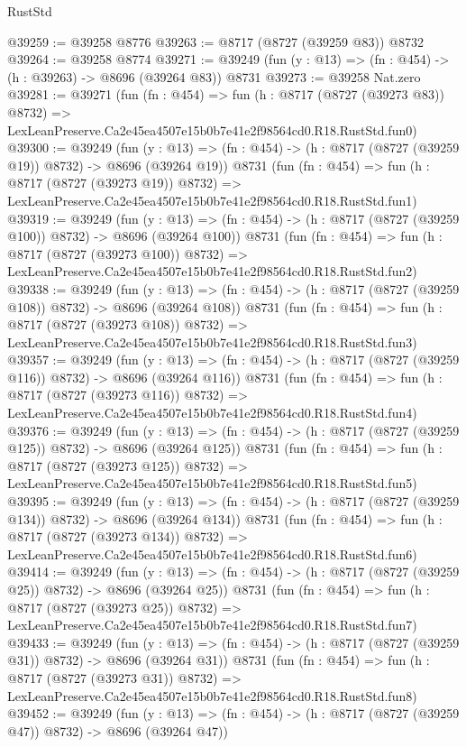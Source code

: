 \begin{lexlean}{RustStd}
\begin{coremodule}
@39259 := @39258 @8776
@39263 := @8717 (@8727 (@39259 @83)) @8732
@39264 := @39258 @8774
@39271 := @39249 (fun (y : @13) => (fn : @454) -> (h : @39263) -> @8696 (@39264 @83)) @8731
@39273 := @39258 Nat.zero
@39281 := @39271
    (fun (fn : @454) =>
    fun (h : @8717 (@8727 (@39273 @83)) @8732) =>
    LexLeanPreserve.Ca2e45ea4507e15b0b7e41e2f98564cd0.R18.RustStd.fun0)
@39300 := @39249
    (fun (y : @13) => (fn : @454) -> (h : @8717 (@8727 (@39259 @19)) @8732) -> @8696 (@39264 @19))
    @8731
    (fun (fn : @454) =>
    fun (h : @8717 (@8727 (@39273 @19)) @8732) =>
    LexLeanPreserve.Ca2e45ea4507e15b0b7e41e2f98564cd0.R18.RustStd.fun1)
@39319 := @39249
    (fun (y : @13) => (fn : @454) -> (h : @8717 (@8727 (@39259 @100)) @8732) -> @8696 (@39264 @100))
    @8731
    (fun (fn : @454) =>
    fun (h : @8717 (@8727 (@39273 @100)) @8732) =>
    LexLeanPreserve.Ca2e45ea4507e15b0b7e41e2f98564cd0.R18.RustStd.fun2)
@39338 := @39249
    (fun (y : @13) => (fn : @454) -> (h : @8717 (@8727 (@39259 @108)) @8732) -> @8696 (@39264 @108))
    @8731
    (fun (fn : @454) =>
    fun (h : @8717 (@8727 (@39273 @108)) @8732) =>
    LexLeanPreserve.Ca2e45ea4507e15b0b7e41e2f98564cd0.R18.RustStd.fun3)
@39357 := @39249
    (fun (y : @13) => (fn : @454) -> (h : @8717 (@8727 (@39259 @116)) @8732) -> @8696 (@39264 @116))
    @8731
    (fun (fn : @454) =>
    fun (h : @8717 (@8727 (@39273 @116)) @8732) =>
    LexLeanPreserve.Ca2e45ea4507e15b0b7e41e2f98564cd0.R18.RustStd.fun4)
@39376 := @39249
    (fun (y : @13) => (fn : @454) -> (h : @8717 (@8727 (@39259 @125)) @8732) -> @8696 (@39264 @125))
    @8731
    (fun (fn : @454) =>
    fun (h : @8717 (@8727 (@39273 @125)) @8732) =>
    LexLeanPreserve.Ca2e45ea4507e15b0b7e41e2f98564cd0.R18.RustStd.fun5)
@39395 := @39249
    (fun (y : @13) => (fn : @454) -> (h : @8717 (@8727 (@39259 @134)) @8732) -> @8696 (@39264 @134))
    @8731
    (fun (fn : @454) =>
    fun (h : @8717 (@8727 (@39273 @134)) @8732) =>
    LexLeanPreserve.Ca2e45ea4507e15b0b7e41e2f98564cd0.R18.RustStd.fun6)
@39414 := @39249
    (fun (y : @13) => (fn : @454) -> (h : @8717 (@8727 (@39259 @25)) @8732) -> @8696 (@39264 @25))
    @8731
    (fun (fn : @454) =>
    fun (h : @8717 (@8727 (@39273 @25)) @8732) =>
    LexLeanPreserve.Ca2e45ea4507e15b0b7e41e2f98564cd0.R18.RustStd.fun7)
@39433 := @39249
    (fun (y : @13) => (fn : @454) -> (h : @8717 (@8727 (@39259 @31)) @8732) -> @8696 (@39264 @31))
    @8731
    (fun (fn : @454) =>
    fun (h : @8717 (@8727 (@39273 @31)) @8732) =>
    LexLeanPreserve.Ca2e45ea4507e15b0b7e41e2f98564cd0.R18.RustStd.fun8)
@39452 := @39249
    (fun (y : @13) => (fn : @454) -> (h : @8717 (@8727 (@39259 @47)) @8732) -> @8696 (@39264 @47))

\end{coremodule}
\end{lexlean}

